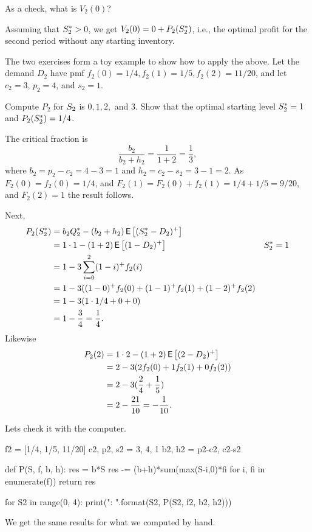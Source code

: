 \begin{exercise}
As a check, what is $V_2(0)$? 
  \begin{solution}
    Assuming that $S_2^*>0$, we get $V_2(0) = 0 + P_2(S_2^*)$, i.e., the optimal profit for the second period without any starting inventory. 
  \end{solution}
\end{exercise}

The two exercises form a toy example to show how to apply the above. Let the demand $D_2$ have  pmf 
$f_2(0)=1/4, f_2(1)=1/5, f_2(2)=11/20$, and let $c_2=3$, $p_2=4$, and $s_2=1$. 

\begin{exercise}
Compute $P_2$ for $S_2$ is $0, 1, 2,$ and $3$. Show that the optimal starting level $S^*_2 = 1$ and $P_2(S_2^*) = 1/4$.
\begin{solution}
The critical fraction is 
\begin{equation*}
\frac{b_2}{b_2+h_2} = \frac{1}{1+2} = \frac 1 3,
\end{equation*}
where $b_2 =p_2-c_2 = 4-3=1$ and $h_2 =c_2 - s_2 = 3-1=2$. 
As $F_2(0)=f_2(0)=1/4$, and $F_2(1)=F_2(0) + f_2(1) = 1/4 + 1/5 = 9/20$, and $F_2(2)=1$ the result follows.

Next, 
\begin{align*}
  P_2(S_2^*) 
&= b_2 Q_2^* - (b_2+h_2)\,\mathsf{E}\left[(S_2^*-D_2)^+\right] \\
&= 1\cdot 1 - (1+2)\,\mathsf{E}\left[(1-D_2)^+\right] & S_2^* = 1\\
&=1 - 3 \sum_{i=0}^2 (1-i)^+ f_2(i) \\
&=1 - 3 ((1-0)^+ f_2(0) + (1-1)^+ f_2(1) +(1-2)^+ f_2(2) \\
&=1 - 3 (1\cdot 1/4 + 0 + 0 ) \\
&=  1 - \frac 3 4 = \frac 1 4.
\end{align*}
Likewise 
\begin{align*}
  P_2(2) 
&= 1\cdot 2 - (1+2)\,\mathsf{E}\left[(2-D_2)^+\right] \\
&= 2 - 3 (2f_2(0) + 1 f_2(1) + 0 f_2(2))\\
&= 2 - 3 (\frac{2}{4} + \frac 1 5)\\
&= 2 - \frac{21}{10} = -\frac 1{10}.
\end{align*}

Lets check it with the computer.
\begin{pyconsole}
f2 = [1/4, 1/5, 11/20]
c2, p2, s2 = 3, 4, 1
b2, h2 = p2-c2, c2-s2

def P(S, f, b, h):
    res = b*S
    res -= (b+h)*sum(max(S-i,0)*fi for i, fi in enumerate(f))
    return res
    
for S2 in range(0, 4):
    print("{}: {}".format(S2, P(S2, f2, b2, h2)))

\end{pyconsole}
We get the same results for what we computed by hand.

\end{solution}
\end{exercise}

